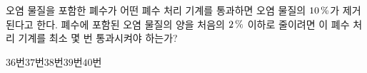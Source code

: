 오염 물질을 포함한 폐수가 어떤 폐수 처리 기계를 통과하면 오염 물질의 $10\mkern3mu \%$가 제거된다고 한다. 폐수에 포함된 오염 물질의 양을 처음의 $2\mkern3mu \%$ 이하로 줄이려면 이 폐수 처리 기계를 최소 몇 번 통과시켜야 하는가? 
\begin{choices32}{$36$번}{$37$번}{$38$번}{$39$번}{$40$번}\end{choices32}

